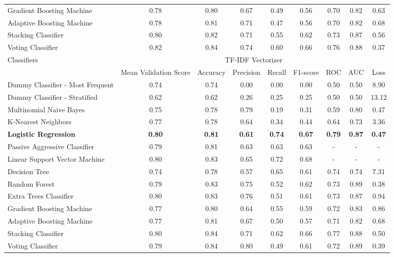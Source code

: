 \documentclass[jou]{apa7}
\begin{document}
\begin{landscape}
\begin{longtable}[l]{lcccccccc}
    Gradient Boosting Machine & 0.78 & 0.80 & 0.67 & 0.49 & 0.56 & 0.70 & 0.82 & 0.63 \\
    Adaptive Boosting Machine & 0.78 & 0.81 & 0.71 & 0.47 & 0.56 & 0.70 & 0.82 & 0.68 \\
    Stacking Classifier & 0.80 & 0.82 & 0.71 & 0.55 & 0.62 & 0.73 & 0.87 & 0.56 \\
    Voting Classifier & 0.82 & 0.84 & 0.74 & 0.60 & 0.66 & 0.76 & 0.88 & 0.37 \\ \hline
    \multirow{2}{*}{Classifiers} & \multicolumn{8}{c}{TF-IDF Vectorizer} \\ \cline{2-9}
    & Mean   Validation Score & Accuracy & Precision & Recall & F1-score & ROC & AUC & Loss \\ \hline
    Dummy Classifier - Most   Frequent & 0.74 & 0.74 & 0.00 & 0.00 & 0.00 & 0.50 & 0.50 & 8.90 \\
    Dummy Classifier - Stratified & 0.62 & 0.62 & 0.26 & 0.25 & 0.25 & 0.50 & 0.50 & 13.12 \\
    Multinomial Naive Bayes & 0.75 & 0.78 & 0.79 & 0.19 & 0.31 & 0.59 & 0.80 & 0.47 \\
    K-Nearest Neighbors & 0.77 & 0.78 & 0.64 & 0.34 & 0.44 & 0.64 & 0.73 & 3.36 \\
    \textbf{Logistic Regression} & \textbf{0.80} & \textbf{0.81} & \textbf{0.61} & \textbf{0.74} & \textbf{0.67} & \textbf{0.79} & \textbf{0.87} & \textbf{0.47} \\
    Passive Aggressive Classifier & 0.79 & 0.81 & 0.63 & 0.63 & 0.63 & - & - & - \\
    Linear Support Vector Machine & 0.80 & 0.83 & 0.65 & 0.72 & 0.68 & - & - & - \\
    Decision Tree & 0.74 & 0.78 & 0.57 & 0.65 & 0.61 & 0.74 & 0.74 & 7.31 \\
    Random Forest & 0.79 & 0.83 & 0.75 & 0.52 & 0.62 & 0.73 & 0.89 & 0.38 \\
    Extra Trees Classifier & 0.80 & 0.83 & 0.76 & 0.51 & 0.61 & 0.73 & 0.87 & 0.94 \\
    Gradient Boosting Machine & 0.77 & 0.80 & 0.64 & 0.55 & 0.59 & 0.72 & 0.83 & 0.86 \\
    Adaptive Boosting Machine & 0.77 & 0.81 & 0.67 & 0.50 & 0.57 & 0.71 & 0.82 & 0.68 \\
    Stacking Classifier & 0.80 & 0.84 & 0.71 & 0.62 & 0.66 & 0.77 & 0.88 & 0.50 \\
    Voting Classifier & 0.79 & 0.84 & 0.80 & 0.49 & 0.61 & 0.72 & 0.89 & 0.39 \\ \hline

\end{longtable}
\end{landscape}
\end{document}
